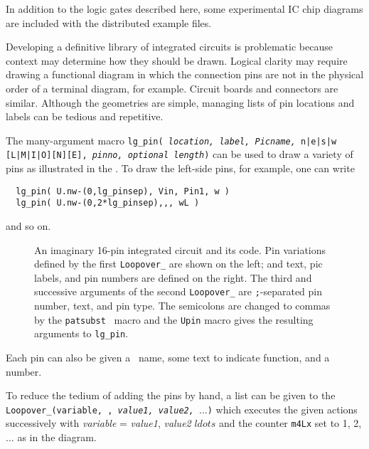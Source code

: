 In addition to the logic gates described here, some experimental
IC chip diagrams are included with the distributed example files.

Developing a definitive library of integrated circuits is problematic
because context may determine how they should be drawn.  Logical clarity
may require drawing a functional diagram in which the connection pins are
not in the physical order of a terminal diagram, for example.  Circuit
boards and connectors are similar. Although the geometries are simple,
managing lists of pin locations and labels can be tedious and repetitive.

The many-argument macro
 {\tt lg\_pin( {\sl location, label, Picname,} n|e|s|w [L|M|I|O][N][E],
  {\sl pinno, optional length})}
can be used to draw a variety of pins as illustrated in the .
To draw the left-side pins, for example, one can write
\begin{verbatim}
  lg_pin( U.nw-(0,lg_pinsep), Vin, Pin1, w )
  lg_pin( U.nw-(0,2*lg_pinsep),,, wL )
\end{verbatim}
\noindent
and so on.
\begin{figure}[h!]
   \parbox{\textwidth}{\small}%
   \hfill\llap{\raise-0.15in\hbox{ }}%
   \vspace*{-\baselineskip}%
   \caption{ An imaginary 16-pin integrated circuit and its code.
    Pin variations defined by the first {\tt Loopover\_}
    are shown on the left; and text, pic labels, and pin
    numbers are defined on the right.
    The third and successive arguments of the second
    {\tt Loopover\_}
    are {\tt ;}-separated pin number, text, and pin type. The
    semicolons are changed to commas by the {\tt patsubst} \Mfour\ macro
    and the {\tt Upin} macro gives the resulting arguments to {\tt lg\_pin}.
\label{sampleIC}}%
   \end{figure}
Each pin can also be given a \pic\ name, some text
to indicate function, and a number.

To reduce the tedium of adding the pins by hand, a list
can be given to the
{\tt Loopover\_(variable,
,
{\sl value1, value2, $\ldots$})}
which executes the given actions successively with
 {\sl variable} = {\sl value1}, {\sl value2} $ldots$ and the
 counter {\tt m4Lx} set to 1, 2, $\ldots$ as in the diagram.


